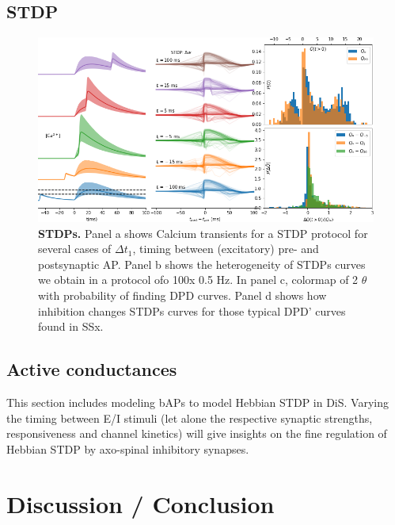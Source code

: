 \documentclass[10pt,letterpaper]{article}
\begin{document}
\subsection*{STDP}

\begin{figure}[htb!]
\includegraphics[width=1.0\linewidth]{f4}
\caption{{\bf STDPs.} Panel a shows Calcium transients for a STDP protocol for several cases of $\Delta t_1$, timing between (excitatory) pre- and postsynaptic AP. Panel b shows the heterogeneity of STDPs curves we obtain in a protocol ofo 100x 0.5 Hz. In panel c, colormap of 2 $\theta$ with probability of finding DPD curves. Panel d shows how inhibition changes STDPs curves for those typical DPD' curves found in SSx. 
}\label{fig:stdps}
\end{figure}



\subsection*{Active conductances}\label{sec:active conductances}

This section includes modeling bAPs to model Hebbian STDP in DiS. Varying the timing between E/I stimuli (let alone the respective synaptic strengths, responsiveness and channel kinetics) will give insights on the fine regulation of Hebbian STDP by axo-spinal inhibitory synapses.

\section*{Discussion / Conclusion}


%
%
% 
\end{document}
